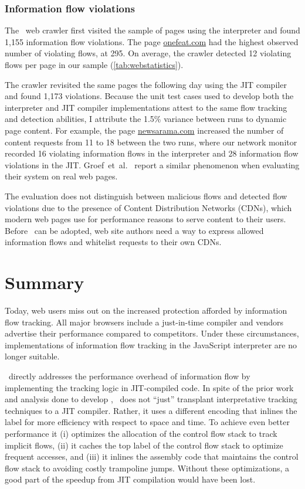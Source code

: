 \subsubsection{Information flow violations}

The \JitFlow\ web crawler first visited the sample of pages using the interpreter and found 1,155 information flow violations.
The page \url{onefeat.com} had the highest observed number of violating flows, at 295.
On average, the crawler detected 12 violating flows per page in our sample (\autoref{tab:webstatistics}).

The crawler revisited the same pages the following day using the JIT compiler and found 1,173 violations.
Because the unit test cases used to develop both the interpreter and JIT compiler implementations attest to the same flow tracking and detection abilities, I attribute the 1.5\% variance between runs to dynamic page content.
For example, the page \url{newsarama.com} increased the number of content requests from 11 to 18 between the two runs, where our network monitor recorded 16 violating information flows in the interpreter and 28 information flow violations in the JIT.
Groef~et~al.~\cite{groef.etal+12} report a similar phenomenon when evaluating their system on real web pages.

The evaluation does not distinguish between malicious flows and detected flow violations due to the presence of Content Distribution Networks (CDNs), which modern web pages use for performance reasons to serve content to their users.
Before \JitFlow\ can be adopted, web site authors need a way to express allowed information flows and whitelist requests to their own CDNs.

\section{Summary}

Today, web users miss out on the increased protection afforded by information flow tracking.
All major browsers include a just-in-time compiler and vendors advertise their performance compared to competitors.
Under these circumstances, implementations of information flow tracking in the JavaScript interpreter are no longer suitable.

\JitFlow\ directly addresses the performance overhead of information flow by implementing the tracking logic in JIT-compiled code.
In spite of the prior work and analysis done to develop \FlowCore, \JitFlow\ does not ``just'' transplant interpretative tracking techniques to a JIT compiler.
Rather, it uses a different encoding that inlines the label for more efficiency with respect to space and time.
To achieve even better performance it (i) optimizes the allocation of the control flow stack to track implicit flows, (ii) it caches the top label of the control flow stack to optimize frequent accesses, and (iii) it inlines the assembly code that maintains the control flow stack to avoiding costly trampoline jumps.
Without these optimizations, a good part of the speedup from JIT compilation would have been lost.

